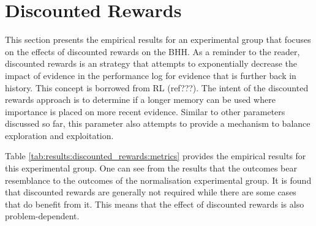 \section{Discounted Rewards}
\label{sec:results:discounted_rewards}

This section presents the empirical results for an experimental group that focuses on the effects of discounted rewards on the \Ac{BHH}. As a reminder to the reader, discounted rewards is an strategy that attempts to exponentially decrease the impact of evidence in the performance log for evidence that is further back in history. This concept is borrowed from \Ac{RL} (ref???). The intent of the discounted rewards approach is to determine if a longer memory can be used where importance is placed on more recent evidence. Similar to other parameters discussed so far, this parameter also attempts to provide a mechanism to balance exploration and exploitation.

Table \ref{tab:results:discounted_rewards:metrics} provides the empirical results for this experimental group. One can see from the results that the outcomes bear resemblance to the outcomes of the normalisation experimental group. It is found that discounted rewards are generally not required while there are some cases that do benefit from it. This means that the effect of discounted rewards is also problem-dependent.

